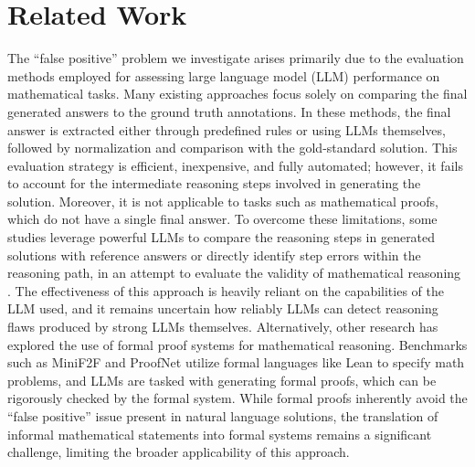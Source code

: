 \section{Related Work}
The ``false positive'' problem we investigate arises primarily due to the evaluation methods employed for assessing large language model (LLM) performance on mathematical tasks. Many existing approaches focus solely on comparing the final generated answers to the ground truth annotations. In these methods, the final answer is extracted either through predefined rules or using LLMs themselves, followed by normalization and comparison with the gold-standard solution. This evaluation strategy is efficient, inexpensive, and fully automated; however, it fails to account for the intermediate reasoning steps involved in generating the solution. Moreover, it is not applicable to tasks such as mathematical proofs, which do not have a single final answer. To overcome these limitations, some studies leverage powerful LLMs to compare the reasoning steps in generated solutions with reference answers or directly identify step errors within the reasoning path, in an attempt to evaluate the validity of mathematical reasoning \cite{he2023socreval, tyen2023llms, hao2024llm}. The effectiveness of this approach is heavily reliant on the capabilities of the LLM used, and it remains uncertain how reliably LLMs can detect reasoning flaws produced by strong LLMs themselves. Alternatively, other research has explored the use of formal proof systems for mathematical reasoning. Benchmarks such as MiniF2F \cite{zheng2021minif2f} and ProofNet \cite{azerbayev2023proofnet} utilize formal languages like Lean \cite{moura2021lean} to specify math problems, and LLMs are tasked with generating formal proofs, which can be rigorously checked by the formal system. While formal proofs inherently avoid the ``false positive'' issue present in natural language solutions, the translation of informal mathematical statements into formal systems remains a significant challenge, limiting the broader applicability of this approach.

